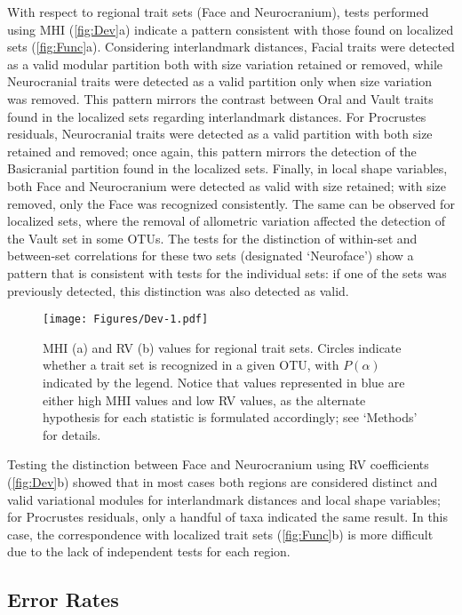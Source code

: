 \documentclass[12pt,twoside]{report}
\begin{document}
With respect to regional trait sets (Face and Neurocranium), tests
performed using MHI (\autoref{fig:Dev}a) indicate a pattern consistent
with those found on localized sets (\autoref{fig:Func}a). Considering
interlandmark distances, Facial traits were detected as a valid modular
partition both with size variation retained or removed, while
Neurocranial traits were detected as a valid partition only when size
variation was removed. This pattern mirrors the contrast between Oral
and Vault traits found in the localized sets regarding interlandmark
distances. For Procrustes residuals, Neurocranial traits were detected
as a valid partition with both size retained and removed; once again,
this pattern mirrors the detection of the Basicranial partition found in
the localized sets. Finally, in local shape variables, both Face and
Neurocranium were detected as valid with size retained; with size
removed, only the Face was recognized consistently. The same can be
observed for localized sets, where the removal of allometric variation
affected the detection of the Vault set in some OTUs. The tests for the
distinction of within-set and between-set correlations for these two
sets (designated `Neuroface') show a pattern that is consistent with
tests for the individual sets: if one of the sets was previously
detected, this distinction was also detected as valid.

\begin{figure}[htbp]
\centering
\texttt{[image: Figures/Dev-1.pdf]}
\caption{MHI (a) and RV (b) values for regional trait sets. Circles
indicate whether a trait set is recognized in a given OTU, with
$P(\alpha)$ indicated by the legend. Notice that values represented in
blue are either high MHI values and low RV values, as the alternate
hypothesis for each statistic is formulated accordingly; see `Methods'
for details. \label{fig:Dev}}
\end{figure}

Testing the distinction between Face and Neurocranium using RV
coefficients (\autoref{fig:Dev}b) showed that in most cases both regions
are considered distinct and valid variational modules for interlandmark
distances and local shape variables; for Procrustes residuals, only a
handful of taxa indicated the same result. In this case, the
correspondence with localized trait sets (\autoref{fig:Func}b) is more
difficult due to the lack of independent tests for each region.

\subsection{Error Rates}\label{error-rates}
\end{document}
